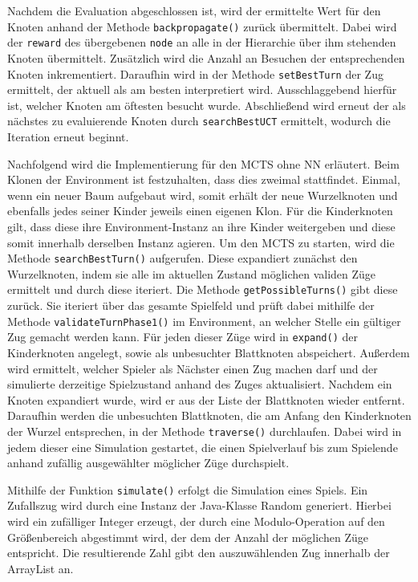 \documentclass[12pt,a4paper]{article}
\begin{document}
Nachdem die Evaluation abgeschlossen ist, wird der ermittelte Wert für den Knoten anhand der Methode \texttt{backpropagate()} zurück übermittelt. Dabei wird der \texttt{reward} des übergebenen \texttt{node} an alle in der Hierarchie über ihm stehenden Knoten übermittelt. Zusätzlich wird die Anzahl an Besuchen der entsprechenden Knoten inkrementiert. Daraufhin wird in der Methode \texttt{setBestTurn} der Zug ermittelt, der aktuell als am besten interpretiert wird. Ausschlaggebend hierfür ist, welcher Knoten am öftesten besucht wurde. Abschließend wird erneut der als nächstes zu evaluierende Knoten durch \texttt{searchBestUCT} ermittelt, wodurch die Iteration erneut beginnt.

Nachfolgend wird die Implementierung für den MCTS ohne NN erläutert. Beim Klonen der Environment ist festzuhalten, dass dies zweimal stattfindet. Einmal, wenn ein neuer Baum aufgebaut wird, somit erhält der neue Wurzelknoten und ebenfalls jedes seiner Kinder jeweils einen eigenen Klon. Für die Kinderknoten gilt, dass diese ihre Environment-Instanz an ihre Kinder weitergeben und diese somit innerhalb derselben Instanz agieren. Um den MCTS zu starten, wird die Methode \texttt{searchBestTurn()} aufgerufen. Diese expandiert zunächst den Wurzelknoten, indem sie alle im aktuellen Zustand möglichen validen Züge ermittelt und durch diese iteriert. Die Methode \texttt{getPossibleTurns()} gibt diese zurück. Sie iteriert über das gesamte Spielfeld und prüft dabei mithilfe der Methode \texttt{validateTurnPhase1()} im Environment, an welcher Stelle ein gültiger Zug gemacht werden kann. Für jeden dieser Züge wird in \texttt{expand()} der Kinderknoten angelegt, sowie als unbesuchter Blattknoten abspeichert. Außerdem wird ermittelt, welcher Spieler als Nächster einen Zug machen darf und der simulierte derzeitige Spielzustand anhand des Zuges aktualisiert. Nachdem ein Knoten expandiert wurde, wird er aus der Liste der Blattknoten wieder entfernt.
Daraufhin werden die unbesuchten Blattknoten, die am Anfang den Kinderknoten der Wurzel entsprechen, in der Methode \texttt{traverse()} durchlaufen. Dabei wird in jedem dieser eine Simulation gestartet, die einen Spielverlauf bis zum Spielende anhand zufällig ausgewählter möglicher Züge durchspielt. 

Mithilfe der Funktion \texttt{simulate()} erfolgt die Simulation eines Spiels. Ein Zufallszug wird durch eine Instanz der Java-Klasse Random generiert. Hierbei wird ein zufälliger Integer erzeugt, der durch eine Modulo-Operation auf den Größenbereich abgestimmt wird, der dem der Anzahl der möglichen Züge entspricht. Die resultierende Zahl gibt den auszuwählenden Zug innerhalb der ArrayList an.
\end{document}

